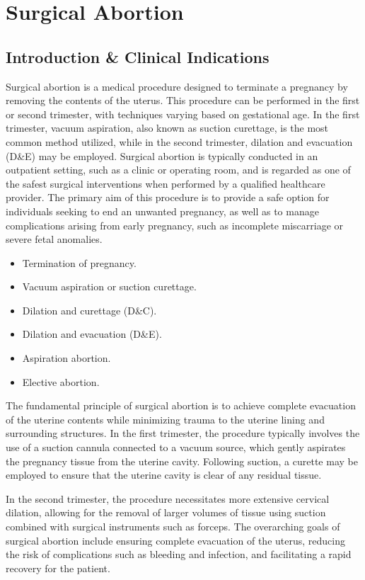\chapter{Surgical Abortion}

\section*{Introduction \& Clinical Indications}
Surgical abortion is a medical procedure designed to terminate a pregnancy by removing the contents of the uterus. This procedure can be performed in the first or second trimester, with techniques varying based on gestational age. In the first trimester, vacuum aspiration, also known as suction curettage, is the most common method utilized, while in the second trimester, dilation and evacuation (D\&E) may be employed. Surgical abortion is typically conducted in an outpatient setting, such as a clinic or operating room, and is regarded as one of the safest surgical interventions when performed by a qualified healthcare provider. The primary aim of this procedure is to provide a safe option for individuals seeking to end an unwanted pregnancy, as well as to manage complications arising from early pregnancy, such as incomplete miscarriage or severe fetal anomalies.

\begin{itemize}
  \item Termination of pregnancy.
  \item Vacuum aspiration or suction curettage.
  \item Dilation and curettage (D\&C).
  \item Dilation and evacuation (D\&E).
  \item Aspiration abortion.
  \item Elective abortion.
\end{itemize}

The fundamental principle of surgical abortion is to achieve complete evacuation of the uterine contents while minimizing trauma to the uterine lining and surrounding structures. In the first trimester, the procedure typically involves the use of a suction cannula connected to a vacuum source, which gently aspirates the pregnancy tissue from the uterine cavity. Following suction, a curette may be employed to ensure that the uterine cavity is clear of any residual tissue. 

In the second trimester, the procedure necessitates more extensive cervical dilation, allowing for the removal of larger volumes of tissue using suction combined with surgical instruments such as forceps. The overarching goals of surgical abortion include ensuring complete evacuation of the uterus, reducing the risk of complications such as bleeding and infection, and facilitating a rapid recovery for the patient.

